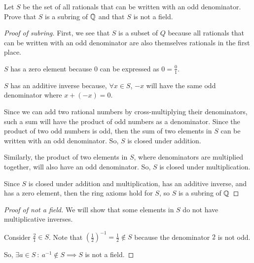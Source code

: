 \documentclass[../hw3]{subfiles}
\begin{document}
\begin{problem}
Let $S$ be the set of all rationals that can be written with an odd denominator. \\
Prove that  $S$ is a subring of  $\mathbb{Q}$ and that $S$ is not a field.
\end{problem}
\begin{proof}[Proof of subring]
	First, we see that $S$ is a subset of $Q$ because all rationals that can be written with an odd denominator are also themselves rationals in the first place.

	$S$ has a zero element because $0$ can be expressed as $0=\frac{0}{1}$.

	$S$ has an additive inverse because, $\forall x \in S$, $-x$ will have the same odd denominator where $x + (-x) = 0$.

	Since we can add two rational numbers by cross-multiplying their denominators, such a sum will have the product of odd numbers as a denominator.
	Since the product of two odd numbers is odd, then the sum of two elements in $S$ can be written with an odd denominator.
	So, $S$ is closed under addition.

	Similarly, the product of two elements in $S$, where denominators are multiplied together, will also have an odd denominator.
	So, $S$ is closed under multiplication.

	Since $S$ is closed under addition and multiplication, has an additive inverse, and has a zero element, then the ring axioms hold for $S$, so $S$ is a subring of  $\mathbb{Q}$
\end{proof}

\begin{proof}[Proof of not a field]
	We will show that some elements in $S$ do not have multiplicative inverses.

	Consider $\frac{2}{1}\in S$. Note that ${\left( \frac{1}{2} \right) }^{-1} = \frac{1}{2} \not\in S$ because the denominator $2$ is not odd.

	So, $\exists a\in S\ :\ a^{-1}\not\in S \implies S$ is not a field.
\end{proof}
\end{document}
